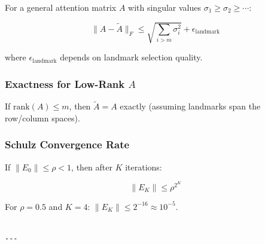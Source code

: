 For a general attention matrix $A$ with singular values $\sigma_1 \ge \sigma_2 \ge \cdots$:

\begin{equation}
\|A - \tilde{A}\|_F \leq \sqrt{\sum_{i > m} \sigma_i^2} + \epsilon_\text{landmark}
\end{equation}

where $\epsilon_\text{landmark}$ depends on landmark selection quality.

\subsubsection{Exactness for Low-Rank $A$}

If $\text{rank}(A) \le m$, then $\tilde{A} = A$ exactly (assuming landmarks 
span the row/column spaces).

\subsubsection{Schulz Convergence Rate}

If $\|E_0\| \le \rho < 1$, then after $K$ iterations:

\begin{equation}
\|E_K\| \le \rho^{2^K}
\end{equation}

For $\rho = 0.5$ and $K = 4$: $\|E_K\| \le 2^{-16} \approx 10^{-5}$.
\begin{lstlisting}

---
\end{lstlisting}
